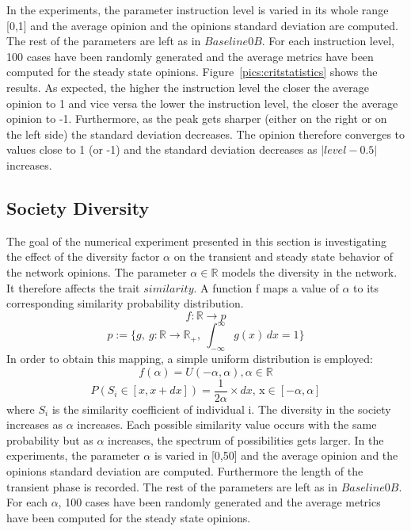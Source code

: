 In the experiments, the parameter instruction level is varied in its whole range [0,1] and the average opinion and the opinions standard deviation are computed. The rest of the parameters are left as in $Baseline0B$. For each instruction level, 100 cases have been randomly generated and the average metrics have been computed for the steady state opinions.
Figure~\ref{pics:critstatistics} shows the results. As expected, the higher the instruction level the closer the average opinion to 1 and vice versa the lower the instruction level, the closer the average opinion to -1. Furthermore, as the peak gets sharper (either on the right or on the left side) the standard deviation decreases. The opinion therefore converges to values close to 1 (or -1) and the standard deviation decreases as $|level-0.5|$ increases. 
\subsection{Society Diversity}
The goal of the numerical experiment presented in this section is investigating the effect of the diversity factor $\alpha$ on the transient and steady state behavior of the network opinions. The parameter $\alpha \in \mathbb{R}$ models the diversity in the network. It therefore affects the trait $similarity$.
A function f maps a value of $\alpha$ to its corresponding similarity probability distribution. 
$$
f: \mathbb{R} \to p 
$$
$$
p:= \{g,\ g: \mathbb{R} \to \mathbb{R}_+,\ \int_{-\infty}^{\infty} g(x) \,dx = 1\}
$$
In order to obtain this mapping, a simple uniform distribution is employed:
$$
f(\alpha) = U(-\alpha, \alpha), \alpha \in \mathbb{R}
$$
$$
P(S_i\in[x,x+dx]) =  \frac{1}{2\alpha} \times dx\text{, x}\in [-\alpha, \alpha]
$$
where $S_i$ is the similarity coefficient of individual i.
The diversity in the society increases as $\alpha$ increases. Each possible similarity value occurs with the same probability but as $\alpha$ increases, the spectrum of possibilities gets larger. \newline
In the experiments, the parameter $\alpha$ is varied in [0,50] and the average opinion and the opinions standard deviation are computed. Furthermore the length of the transient phase is recorded. The rest of the parameters are left as in $Baseline0B$. For each $\alpha$, 100 cases have been randomly generated and the average metrics have been computed for the steady state opinions. 

